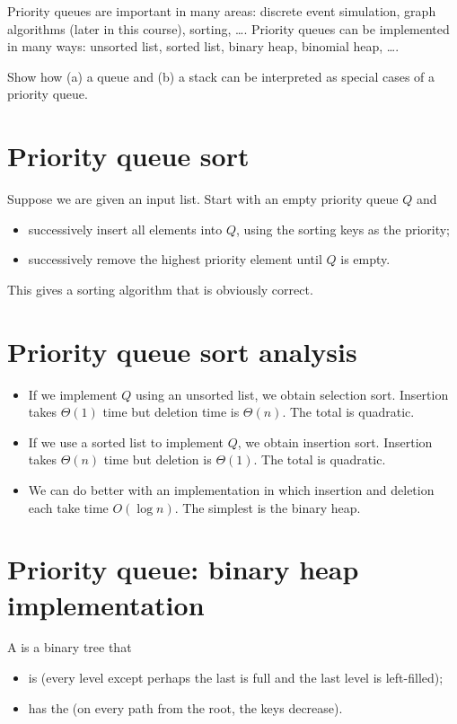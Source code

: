 Priority queues are important in many areas: discrete event simulation, 
graph algorithms (later in this course), sorting, \dots .
Priority queues can be implemented in many ways: unsorted list, sorted 
list, binary heap, binomial heap, \dots . 

\begin{Boxample}[3]
Show how (a) a queue and (b) a stack can be interpreted as special cases of a priority queue.
\end{Boxample}

\section{Priority queue sort}
Suppose we are given an input list. Start with an empty priority queue $Q$
and
\begin{itemize}
\item successively insert all elements into $Q$, using the sorting keys as the 
priority;
\item successively remove the highest priority element until $Q$ is empty. 
\end{itemize}
This gives a sorting algorithm that is obviously correct. 

\section{Priority queue sort analysis}
\begin{itemize}
\item If we implement $Q$ using an unsorted list, we obtain selection sort. 
Insertion takes $\Theta(1)$ time but deletion time is $\Theta(n)$. The total is quadratic.
\item If we use a sorted list to implement $Q$, we obtain insertion sort. 
Insertion takes $\Theta(n)$ time but deletion is $\Theta(1)$. The total is quadratic.
\item We can do better with an implementation in which insertion and deletion 
each take time $O(\log n)$. The simplest is the binary heap.
\end{itemize}

\section{Priority queue: binary heap implementation}
\begin{Definition}
A  is a binary tree that 
\begin{itemize}
\item is  (every level except perhaps the last is full and 
the last level is left-filled);
\item has the  (on every path from the root, the keys decrease). 
\end{itemize}
\end{Definition}

